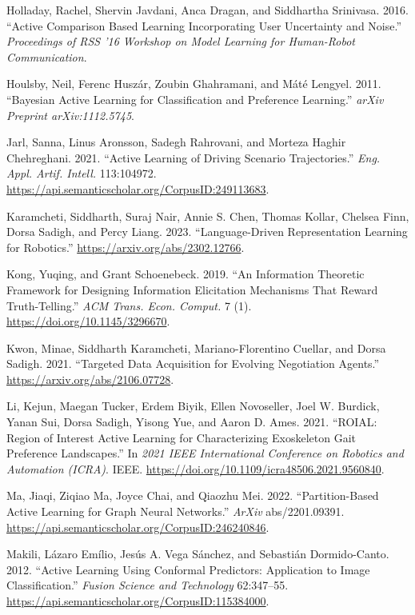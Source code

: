 \documentclass[
  letterpaper,
  numbers=noenddot,
  DIV=11]{scrreprt}
\newlength{\cslhangindent}
\newenvironment{CSLReferences}[2] %
 {\begin{list}{}{%
  \setlength{\itemindent}{0pt}
  \setlength{\leftmargin}{0pt}
  \setlength{\parsep}{0pt}
  \ifodd #1
   \setlength{\leftmargin}{\cslhangindent}
   \setlength{\itemindent}{-1\cslhangindent}
  \fi
  \setlength{\itemsep}{#2\baselineskip}}}
 {\end{list}}
\theoremstyle{definition}
\theoremstyle{plain}
\theoremstyle{plain}
\theoremstyle{remark}
\begin{document}
\begin{CSLReferences}{1}{0}
Holladay, Rachel, Shervin Javdani, Anca Dragan, and Siddhartha
Srinivasa. 2016. {``Active Comparison Based Learning Incorporating User
Uncertainty and Noise.''} \emph{Proceedings of RSS '16 Workshop on Model
Learning for Human-Robot Communication}.

Houlsby, Neil, Ferenc Huszár, Zoubin Ghahramani, and Máté Lengyel. 2011.
{``Bayesian Active Learning for Classification and Preference
Learning.''} \emph{arXiv Preprint arXiv:1112.5745}.

Jarl, Sanna, Linus Aronsson, Sadegh Rahrovani, and Morteza Haghir
Chehreghani. 2021. {``Active Learning of Driving Scenario
Trajectories.''} \emph{Eng. Appl. Artif. Intell.} 113:104972.
\url{https://api.semanticscholar.org/CorpusID:249113683}.

Karamcheti, Siddharth, Suraj Nair, Annie S. Chen, Thomas Kollar, Chelsea
Finn, Dorsa Sadigh, and Percy Liang. 2023. {``Language-Driven
Representation Learning for Robotics.''}
\url{https://arxiv.org/abs/2302.12766}.

Kong, Yuqing, and Grant Schoenebeck. 2019. {``An Information Theoretic
Framework for Designing Information Elicitation Mechanisms That Reward
Truth-Telling.''} \emph{ACM Trans. Econ. Comput.} 7 (1).
\url{https://doi.org/10.1145/3296670}.

Kwon, Minae, Siddharth Karamcheti, Mariano-Florentino Cuellar, and Dorsa
Sadigh. 2021. {``Targeted Data Acquisition for Evolving Negotiation
Agents.''} \url{https://arxiv.org/abs/2106.07728}.

Li, Kejun, Maegan Tucker, Erdem Biyik, Ellen Novoseller, Joel W.
Burdick, Yanan Sui, Dorsa Sadigh, Yisong Yue, and Aaron D. Ames. 2021.
{``ROIAL: Region of Interest Active Learning for Characterizing
Exoskeleton Gait Preference Landscapes.''} In \emph{2021 IEEE
International Conference on Robotics and Automation (ICRA)}. IEEE.
\url{https://doi.org/10.1109/icra48506.2021.9560840}.

Ma, Jiaqi, Ziqiao Ma, Joyce Chai, and Qiaozhu Mei. 2022.
{``Partition-Based Active Learning for Graph Neural Networks.''}
\emph{ArXiv} abs/2201.09391.
\url{https://api.semanticscholar.org/CorpusID:246240846}.

Makili, Lázaro Emílio, Jesús A. Vega Sánchez, and Sebastián
Dormido-Canto. 2012. {``Active Learning Using Conformal Predictors:
Application to Image Classification.''} \emph{Fusion Science and
Technology} 62:347--55.
\url{https://api.semanticscholar.org/CorpusID:115384000}.


\end{CSLReferences}
\end{document}
